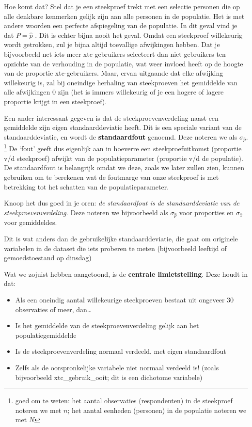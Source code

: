 \documentclass[
  letterpaper,
  DIV=11,
  numbers=noendperiod]{scrreprt}
\providecommand{\tightlist}{%
  \setlength{\itemsep}{0pt}\setlength{\parskip}{0pt}}
\begin{document}
Hoe komt dat? Stel dat je een steekproef trekt met een selectie personen
die op alle denkbare kenmerken gelijk zijn aan alle personen in de
populatie. Het is met andere woorden een perfecte afspiegeling van de
populatie. In dit geval vind je dat \(P=\hat{p}\) . Dit is echter bijna
nooit het geval. Omdat een steekproef willekeurig wordt getrokken, zul
je bijna altijd toevallige afwijkingen hebben. Dat je bijvoorbeeld net
iets meer xtc-gebruikers selecteert dan niet-gebruikers ten opzichte van
de verhouding in de populatie, wat weer invloed heeft op de hoogte van
de proportie xtc-gebruikers. Maar, ervan uitgaande dat elke afwijking
willekeurig is, zal bij oneindige herhaling van steekproeven het
gemiddelde van alle afwijkingen 0 zijn (het is immers willekeurig of je
een hogere of lagere proportie krijgt in een steekproef).

Een ander interessant gegeven is dat de steekproevenverdeling naast een
gemiddelde zijn eigen standaarddeviatie heeft. Dit is een speciale
variant van de standaarddeviatie, en wordt de \textbf{standaardfout}
genoemd. Deze noteren we als \(\sigma_{\hat{p}}\). \footnote{goed om te
  weten: het aantal observaties (respondenten) in de steekproef noteren
  we met \(n\); het aantal eenheden (personen) in de populatie noteren
  we met \(N\)} De `fout' geeft dus eigenlijk aan in hoeverre een
steekproefuitkomst (proportie v/d steekproef) afwijkt van de
populatieparameter (proportie v/d de populatie). De standaardfout is
belangrijk omdat we deze, zoals we later zullen zien, kunnen gebruiken
om te berekenen wat de foutmarge van onze steekproef is met betrekking
tot het schatten van de populatieparameter.

Knoop het dus goed in je oren: \emph{de standaardfout is de
standaarddeviatie van de steekproevenverdeling}. Deze noteren we
bijvoorbeeld als \(\sigma_{\hat{p}}\) voor proporties en
\(\sigma_{\bar{x}}\) voor gemiddeldes.

Dit is wat anders dan de gebruikelijke standaarddeviatie, die gaat om
originele variabelen in de dataset die iets proberen te meten
(bijvoorbeeld leeftijd of gemoedstoestand op dinsdag)

Wat we zojuist hebben aangetoond, is de \textbf{centrale
limietstelling}. Deze houdt in dat:

\begin{itemize}
\tightlist
\item
  Als een oneindig aantal willekeurige steekproeven bestaat uit ongeveer
  30 observaties of meer, dan\ldots{}
\item
  Is het gemiddelde van de steekproevenverdeling gelijk aan het
  populatiegemiddelde
\item
  Is de steekproevenverdeling normaal verdeeld, met eigen standaardfout
\item
  Zelfs als de oorspronkelijke variabele niet normaal verdeeld is!
  (zoals bijvoorbeeld xtc\_gebruik\_ooit; dit is een dichotome
  variabele)
\end{itemize}
\end{document}
